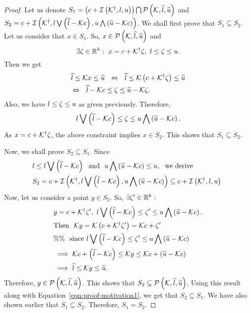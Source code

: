 \begin{proof}
Let us denote
$S_1=\left(c+\mathit{\operatorname{\mathcal{I}}}\left({\mathcal{K}}^\dagger,l,u\right)\right)\bigcap\mathcal{P}\left(\mathcal{K},\widehat{l},\widehat{u}\right)$
and\\
$S_2=c+\mathit{\operatorname{\mathcal{I}}}\left({\mathcal{K}}^\dagger,l\bigvee \left(\widehat{l}-\mathcal{K}c\right),u\bigwedge \left(\widehat{u}-\mathcal{K}c\right)\right)$.
We shall first prove that $S_1\subseteq S_2$.  Let us consider that
$x\in S_1$.  So, $x\in\mathcal{P}\left(\mathcal{K},\widehat{l},\widehat{u}\right)$ and
%
\[
\exists
\zeta\in\mathbb{R}^k:~x=c+{\mathcal{K}}^\dagger\zeta,~l\leq\zeta\leq u.
\]
%
Then we get
%
\begin{align*}
& \widehat{l}\leq\mathcal{K} x\leq \widehat{u}~~
 \Leftrightarrow~~ \widehat{l}\leq \mathcal{K}\left(c+{\mathcal{K}}^\dagger\zeta\right)\leq \widehat{u}\\
& \Leftrightarrow~~ \widehat{l}-\mathcal{K}c\leq\zeta\leq\widehat{u}-\mathcal{K}\zeta.
\end{align*}
%
Also, we have $l\leq \zeta\leq u$ as given previously.
Therefore,
\[l\bigvee \left(\widehat{l}-\mathcal{K}c\right)\leq\zeta\leq u\bigwedge \left(\widehat{u}-\mathcal{K}c\right).\]
As $x=c+{\mathcal{K}}^\dagger\zeta$, the above constraint implies $x\in S_2$.  This shows that $S_1\subseteq S_2$.

Now, we shall prove $S_2\subseteq S_1$.  Since
\begin{align}
&l\leq l\bigvee \left(\widehat{l}-\mathcal{K}c\right)~~\text{and}~~u\bigwedge \left(\widehat{u}-\mathcal{K}c\right)\leq
u,~~\text{we derive}\nonumber\\
&
S_2=c+\mathit{\operatorname{\mathcal{I}}}\left({\mathcal{K}}^\dagger,l\bigvee \left(\widehat{l}-\mathcal{K}c\right),u\bigwedge \left(\widehat{u}-\mathcal{K}c\right)\right)
\subseteq c+\mathit{\operatorname{\mathcal{I}}}\left({\mathcal{K}}^\dagger,l,u\right)~\label{eqn:proof-motivation1}
\end{align}
%
Now, let us consider a point $y\in S_2$.  So, $\exists
\zeta^\prime\in\mathbb{R}^k:$
%
\begin{align*}
& y=c+{\mathcal{K}}^\dagger\zeta^\prime,~l\bigvee \left(\widehat{l}-\mathcal{K}c\right)\leq\zeta^\prime
\leq u\bigwedge \left(\widehat{u}-\mathcal{K}c\right).\\
& \text{Then}~~
\mathcal{K} y=\mathcal{K}\left(c+{\mathcal{K}}^\dagger\zeta^\prime\right)=\mathcal{K}c+\zeta^\prime\\
& \%\%~~\text{since}~l\bigvee \left(\widehat{l}-\mathcal{K}c\right)\leq\zeta^\prime\leq
u\bigwedge \left(\widehat{u}-\mathcal{K}c\right)\\
& \implies \mathcal{K}c+\left(\widehat{l}-\mathcal{K}c\right)\leq\mathcal{K} y\leq
\mathcal{K}c+\left(\widehat{u}-\mathcal{K}c\right)\\
& \implies \widehat{l}\leq\mathcal{K} y\leq\widehat{u}.
\end{align*}
%
Therefore, $y\in\mathcal{P}\left(\mathcal{K},\widehat{l},\widehat{u}\right)$.  This shows that
$S_2\subseteq \mathcal{P}\left(\mathcal{K},\widehat{l},\widehat{u}\right)$.  Using this result along with
Equation~\ref{eqn:proof-motivation1}, we get that $S_2\subseteq S_1$.
We have also shown earlier that ${S_1\subseteq S_2}$.  Therefore, $S_1=S_2$.
\end{proof}
